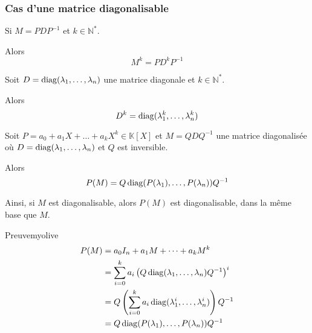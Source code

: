     \subsubsection{Cas d’une matrice diagonalisable}

    \begin{prop}{}{}
        Si $M = P D P^{-1}$ et $k \in \mathbb{N}^*$.

        Alors \[ M^k = P D^k P^{-1} \]
    \end{prop}

    \begin{prop}{}{}
        Soit $D = \operatorname{diag}(\lambda_1,\ldots,\lambda_n)$ une matrice diagonale et $k \in \mathbb{N}^*$.

        Alors \[ D^k = \operatorname{diag}(\lambda_1^k,\ldots,\lambda_n^k) \]
    \end{prop}

    \begin{prop}{}{}
        Soit $P = a_0 + a_1 X + \ldots + a_k X^k \in \mathbb{K}[X]$ et $M = Q D Q^{-1}$ une matrice diagonalisée où $D = \operatorname{diag}(\lambda_1,\ldots,\lambda_n)$ et $Q$ est inversible.

        Alors 
        \[ P(M) = Q \operatorname{diag}(P(\lambda_1), \ldots, P(\lambda_n)) Q^{-1} \]
    \end{prop}

    Ainsi, si $M$ est diagonalisable, alors $P(M)$ est diagonalisable, dans la même base que $M$.

    \begin{demo}{Preuve}{myolive}
        \begin{align*}
            P(M)
            &= a_0 I_n + a_1 M + \cdots + a_k M^k \\
            &= \sum_{i=0}^{k} a_i \left(Q \operatorname{diag}(\lambda_1, \ldots, \lambda_n) Q^{-1}\right)^i \\
            &= Q \left(\sum_{i=0}^{k} a_i \operatorname{diag}(\lambda_1^i, \ldots, \lambda_n^i)\right) Q^{-1} \\
            &= Q \operatorname{diag}(P(\lambda_1), \ldots, P(\lambda_n)) Q^{-1}
        \end{align*}
    \end{demo}

